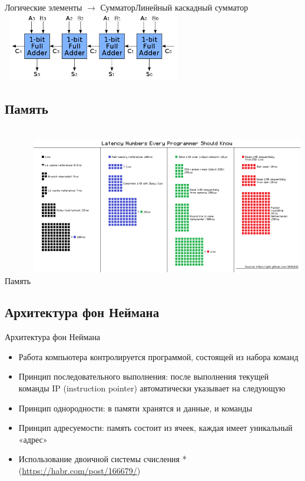 \documentclass[10pt]{beamer}
\begin{document}
\begin{frame}[fragile]{Логические элементы $\rightarrow$ Сумматор}{Линейный каскадный сумматор}
\includegraphics[width=8cm, height=3cm]{Term_1/Source/Pirctures/Ripple_carry_adder.png}
\end{frame}


\subsection{Память}
\begin{frame}[fragile]{Память}
\includegraphics[width=12cm, height=7cm]{Term_1/Source/Pirctures/latency.png}
\end{frame}

\subsection{Архитектура фон Неймана}
\begin{frame}[fragile]{Архитектура фон Неймана}
\begin{itemize}
    \item Работа компьютера контролируется программой, состоящей из набора команд
    \item Принцип последовательного выполнения: после выполнения текущей команды IP (instruction pointer) автоматически указывает на следующую
    \item Принцип однородности: в памяти хранятся и данные, и команды
    \item Принцип адресуемости: память состоит из ячеек, каждая имеет уникальный «адрес»
    \item Использование двоичной системы счисления * (\href{https://habr.com/post/166679/}{https://habr.com/post/166679/})
\end{itemize}
\end{frame}
\end{document}
